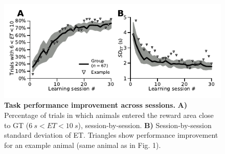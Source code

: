 \begin{figure}[h!]
	\begin{center}
		\includegraphics[scale=1]{ch-appendicies/figures/CorrectTrialCurve.pdf}
		\caption
		{\textbf{Task performance improvement across sessions.}
		\textbf{A)} Percentage of trials in which animals entered the reward area close to GT ($6~s<ET<10~s$), session-by-session.
		\textbf{B)} Session-by-session standard deviation of ET.
		Triangles show performance improvement for an example animal (same animal as in Fig. 1).
		}
		\label{fig:appendix:CorrectTrialCurve}
	\end{center}
\end{figure}